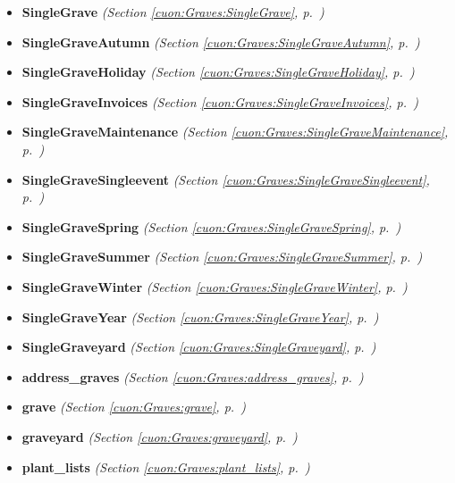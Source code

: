 \begin{itemize}
\setlength{\parskip}{0ex}
\item \textbf{SingleGrave}
  \textit{(Section \ref{cuon:Graves:SingleGrave}, p.~\pageref{cuon:Graves:SingleGrave})}

\item \textbf{SingleGraveAutumn}
  \textit{(Section \ref{cuon:Graves:SingleGraveAutumn}, p.~\pageref{cuon:Graves:SingleGraveAutumn})}

\item \textbf{SingleGraveHoliday}
  \textit{(Section \ref{cuon:Graves:SingleGraveHoliday}, p.~\pageref{cuon:Graves:SingleGraveHoliday})}

\item \textbf{SingleGraveInvoices}
  \textit{(Section \ref{cuon:Graves:SingleGraveInvoices}, p.~\pageref{cuon:Graves:SingleGraveInvoices})}

\item \textbf{SingleGraveMaintenance}
  \textit{(Section \ref{cuon:Graves:SingleGraveMaintenance}, p.~\pageref{cuon:Graves:SingleGraveMaintenance})}

\item \textbf{SingleGraveSingleevent}
  \textit{(Section \ref{cuon:Graves:SingleGraveSingleevent}, p.~\pageref{cuon:Graves:SingleGraveSingleevent})}

\item \textbf{SingleGraveSpring}
  \textit{(Section \ref{cuon:Graves:SingleGraveSpring}, p.~\pageref{cuon:Graves:SingleGraveSpring})}

\item \textbf{SingleGraveSummer}
  \textit{(Section \ref{cuon:Graves:SingleGraveSummer}, p.~\pageref{cuon:Graves:SingleGraveSummer})}

\item \textbf{SingleGraveWinter}
  \textit{(Section \ref{cuon:Graves:SingleGraveWinter}, p.~\pageref{cuon:Graves:SingleGraveWinter})}

\item \textbf{SingleGraveYear}
  \textit{(Section \ref{cuon:Graves:SingleGraveYear}, p.~\pageref{cuon:Graves:SingleGraveYear})}

\item \textbf{SingleGraveyard}
  \textit{(Section \ref{cuon:Graves:SingleGraveyard}, p.~\pageref{cuon:Graves:SingleGraveyard})}

\item \textbf{address\_graves}
  \textit{(Section \ref{cuon:Graves:address_graves}, p.~\pageref{cuon:Graves:address_graves})}

\item \textbf{grave}
  \textit{(Section \ref{cuon:Graves:grave}, p.~\pageref{cuon:Graves:grave})}

\item \textbf{graveyard}
  \textit{(Section \ref{cuon:Graves:graveyard}, p.~\pageref{cuon:Graves:graveyard})}

\item \textbf{plant\_lists}
  \textit{(Section \ref{cuon:Graves:plant_lists}, p.~\pageref{cuon:Graves:plant_lists})}

\end{itemize}


